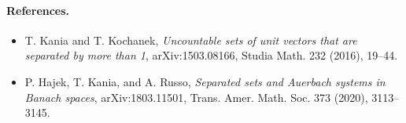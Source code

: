 \documentclass[11pt]{article}
\begin{document}
\paragraph{References.}
\begin{itemize}
\item T. Kania and T. Kochanek, \emph{Uncountable sets of unit vectors that
are separated by more than 1}, arXiv:1503.08166, Studia Math. 232 (2016),
19--44.
\item P. Hajek, T. Kania, and A. Russo, \emph{Separated sets and Auerbach
systems in Banach spaces}, arXiv:1803.11501, Trans. Amer. Math. Soc. 373
(2020), 3113--3145.
\end{itemize}
\end{document}
